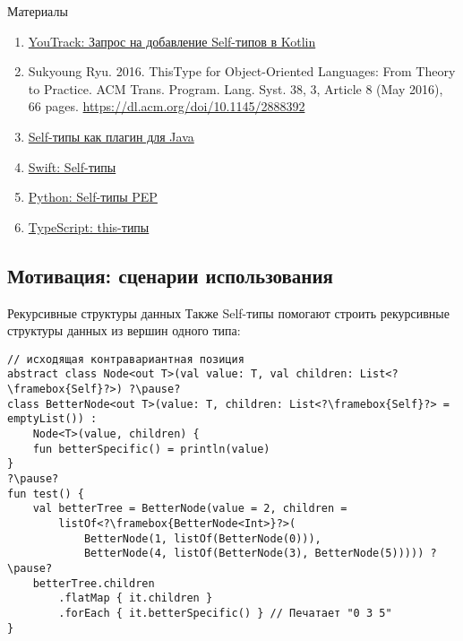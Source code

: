 \documentclass[handout,aspectratio=169,usenames,dvipsnames]{beamer}
\begin{document}
    \begin{frame}{Материалы}
        \begin{enumerate}
            \item \href{https://youtrack.jetbrains.com/issue/KT-6494}{\color{blue} YouTrack: Запрос на добавление Self-типов в Kotlin}
            \item Sukyoung Ryu. 2016. ThisType for Object-Oriented Languages: From Theory to Practice. ACM Trans. Program. Lang. Syst. 38, 3, Article 8 (May 2016), 66 pages. {\color{blue}\url{https://dl.acm.org/doi/10.1145/2888392}}
            \item \href{https://github.com/manifold-systems/manifold/blob/master/manifold-deps-parent/manifold-ext/README.md#the-self-type-with-self}{\color{blue} Self-типы как плагин для Java}
            \item \href{https://docs.swift.org/swift-book/documentation/the-swift-programming-language/types/\#Self-Type}{\color{blue} Swift: Self-типы}
            \item \href{https://peps.python.org/pep-0673/}{\color{blue} Python: Self-типы PEP}
            \item \href{https://www.typescriptlang.org/docs/handbook/2/classes.html\#this-types}{\color{blue}TypeScript: this-типы}
        \end{enumerate}
    \end{frame}

    \subsection{Мотивация: сценарии использования}

    \begin{frame}[fragile]{Рекурсивные структуры данных}
        Также Self-типы помогают строить рекурсивные структуры данных из вершин одного типа:
        \begin{verbatim}
// исходящая контравариантная позиция
abstract class Node<out T>(val value: T, val children: List<?\framebox{Self}?>) ?\pause?
class BetterNode<out T>(value: T, children: List<?\framebox{Self}?> = emptyList()) :
    Node<T>(value, children) {
    fun betterSpecific() = println(value)
}
?\pause?
fun test() {
    val betterTree = BetterNode(value = 2, children =
        listOf<?\framebox{BetterNode<Int>}?>(
            BetterNode(1, listOf(BetterNode(0))),
            BetterNode(4, listOf(BetterNode(3), BetterNode(5))))) ?\pause?
    betterTree.children
        .flatMap { it.children }
        .forEach { it.betterSpecific() } // Печатает "0 3 5"
}
        \end{verbatim}
    \end{frame}
\end{document}
